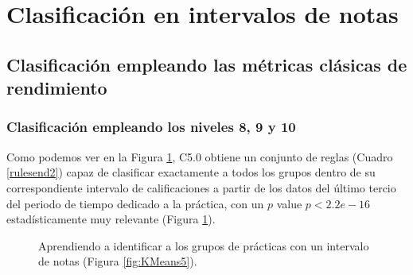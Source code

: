 \section{Clasificación en intervalos de notas}\label{sec:intervals}

\subsection{Clasificación empleando las métricas clásicas de rendimiento}

\subsubsection{Clasificación empleando los niveles 8, 9 y 10}

Como podemos ver en la Figura \ref{fig:cmend2}, C5.0 obtiene un conjunto de reglas (Cuadro \ref{rulesend2}) capaz de clasificar exactamente a todos los grupos dentro de su correspondiente intervalo de calificaciones a partir de los datos del último tercio del periodo de tiempo dedicado a la práctica, con un $p$ value $p < 2.2e-16$ estadísticamente muy relevante (Figura \ref{fig:cmend2}).

\begin{figure}[H]
\centering
{}
\caption{Aprendiendo a identificar a los grupos de prácticas con un intervalo de notas (Figura \ref{fig:KMeans5}).}
\label{fig:cmend2}
\end{figure}


